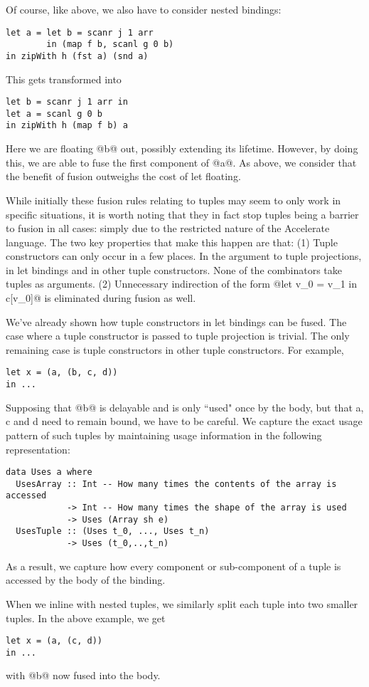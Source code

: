 Of course, like above, we also have to consider nested bindings:
%
\begin{lstlisting}
let a = let b = scanr j 1 arr
        in (map f b, scanl g 0 b)
in zipWith h (fst a) (snd a)
\end{lstlisting}
%
This gets transformed into
%
\begin{lstlisting}
let b = scanr j 1 arr in
let a = scanl g 0 b
in zipWith h (map f b) a
\end{lstlisting}
%
Here we are floating @b@ out, possibly extending its lifetime. However, by doing this, we are able to fuse the first component of @a@. As above, we consider that the benefit of fusion outweighs the cost of let floating.


While initially these fusion rules relating to tuples may seem to only work in specific situations, it is worth noting that they in fact stop tuples being a barrier to fusion in all cases: simply due to the restricted nature of the Accelerate language. The two key properties that make this happen are that:
  (1) Tuple constructors can only occur in a few places. In the argument to tuple projections, in let bindings and in other tuple constructors. None of the combinators take tuples as arguments.
  (2) Unnecessary indirection of the form @let v_0 = v_1 in c[v_0]@ is eliminated during fusion as well.

We've already shown how tuple constructors in let bindings can be fused. The case where a tuple constructor is passed to tuple projection is trivial. The only remaining case is tuple constructors in other tuple constructors. For example,
%
\begin{lstlisting}
let x = (a, (b, c, d))
in ...
\end{lstlisting}
%
Supposing that @b@ is delayable and is only ``used" once by the body, but that a, c and d need to remain bound, we have to be careful. We capture the exact usage pattern of such tuples by maintaining usage information in the following representation:
%
\begin{lstlisting}
data Uses a where
  UsesArray :: Int -- How many times the contents of the array is accessed
            -> Int -- How many times the shape of the array is used
            -> Uses (Array sh e)
  UsesTuple :: (Uses t_0, ..., Uses t_n)
            -> Uses (t_0,..,t_n)
\end{lstlisting}
%
As a result, we capture how every component or sub-component of a tuple is accessed by the body of the binding.

When we inline with nested tuples, we similarly split each tuple into two smaller tuples. In the above example, we get
%
\begin{lstlisting}
let x = (a, (c, d))
in ...
\end{lstlisting}
%
with @b@ now fused into the body.
